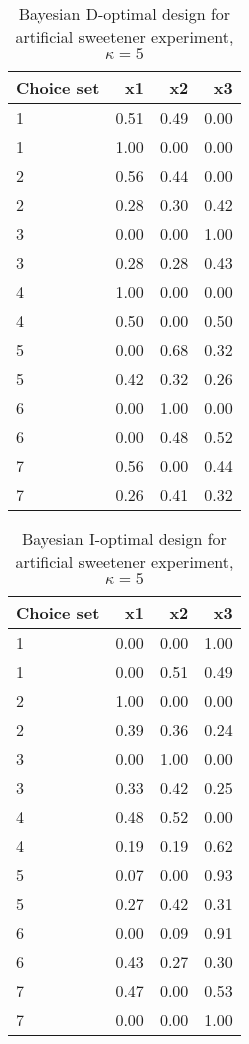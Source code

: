 \begin{table}[ht]
\centering
\begin{tabular}{lrrr}
  \hline
Choice set & x1 & x2 & x3 \\ 
  \hline
1 & 0.51 & 0.49 & 0.00 \\ 
  1 & 1.00 & 0.00 & 0.00 \\ 
  2 & 0.56 & 0.44 & 0.00 \\ 
  2 & 0.28 & 0.30 & 0.42 \\ 
  3 & 0.00 & 0.00 & 1.00 \\ 
  3 & 0.28 & 0.28 & 0.43 \\ 
  4 & 1.00 & 0.00 & 0.00 \\ 
  4 & 0.50 & 0.00 & 0.50 \\ 
  5 & 0.00 & 0.68 & 0.32 \\ 
  5 & 0.42 & 0.32 & 0.26 \\ 
  6 & 0.00 & 1.00 & 0.00 \\ 
  6 & 0.00 & 0.48 & 0.52 \\ 
  7 & 0.56 & 0.00 & 0.44 \\ 
  7 & 0.26 & 0.41 & 0.32 \\ 
   \hline
\end{tabular}
\caption{Bayesian D-optimal design for artificial sweetener experiment, $\kappa = 5$} 
\label{tab:cornell_exp_d_optimal_des_kappa_5}
\end{table}
\begin{table}[ht]
\centering
\begin{tabular}{lrrr}
  \hline
Choice set & x1 & x2 & x3 \\ 
  \hline
1 & 0.00 & 0.00 & 1.00 \\ 
  1 & 0.00 & 0.51 & 0.49 \\ 
  2 & 1.00 & 0.00 & 0.00 \\ 
  2 & 0.39 & 0.36 & 0.24 \\ 
  3 & 0.00 & 1.00 & 0.00 \\ 
  3 & 0.33 & 0.42 & 0.25 \\ 
  4 & 0.48 & 0.52 & 0.00 \\ 
  4 & 0.19 & 0.19 & 0.62 \\ 
  5 & 0.07 & 0.00 & 0.93 \\ 
  5 & 0.27 & 0.42 & 0.31 \\ 
  6 & 0.00 & 0.09 & 0.91 \\ 
  6 & 0.43 & 0.27 & 0.30 \\ 
  7 & 0.47 & 0.00 & 0.53 \\ 
  7 & 0.00 & 0.00 & 1.00 \\ 
   \hline
\end{tabular}
\caption{Bayesian I-optimal design for artificial sweetener experiment, $\kappa = 5$} 
\label{tab:cornell_exp_i_optimal_des_kappa_5}
\end{table}
